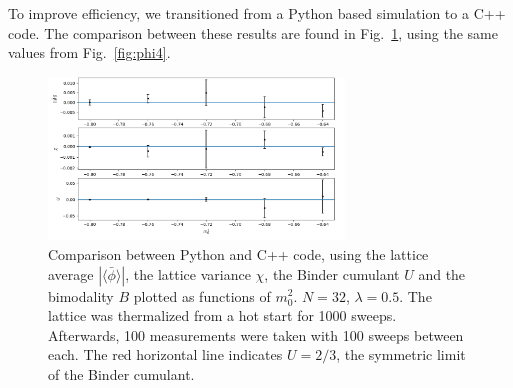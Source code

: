 \documentclass[12pt]{report}
\begin{document}
To improve efficiency, we transitioned from a Python based simulation to a C++ code. The comparison between these results are found in Fig.~\ref{fig:compare}, using the same values from Fig.~\ref{fig:phi4}.

\begin{figure}[h]
  \centering
      \includegraphics[width=0.7\textwidth]{imgs/compare.png}
      \caption{Comparison between Python and C++ code, using the lattice average $|\langle\bar\phi\rangle|$, the lattice variance $\chi$, the Binder cumulant $U$ and the bimodality $B$ plotted as functions of $m_0^2$. $N=32$, $\lambda=0.5$. The lattice was thermalized from a hot start for 1000 sweeps. Afterwards, 100 measurements were taken with 100 sweeps between each. The red horizontal line indicates $U=2/3$, the symmetric limit of the Binder cumulant.}
  \label{fig:compare}
\end{figure}
\end{document}
